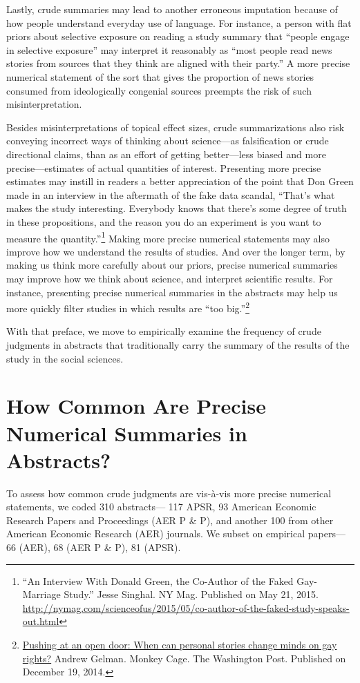 \documentclass[12pt]{article}
\begin{document}
Lastly, crude summaries may lead to another erroneous imputation because of how people understand everyday use of language. For instance, a person with flat priors about selective exposure on reading a study summary that ``people engage in selective exposure'' may interpret it reasonably as ``most people read news stories from sources that they think are aligned with their party.'' A more precise numerical statement of the sort that gives the proportion of news stories consumed from ideologically congenial sources preempts the risk of such misinterpretation. 

Besides misinterpretations of topical effect sizes, crude summarizations also risk conveying incorrect ways of thinking about science---as falsification or crude directional claims, than as an effort of getting better---less biased and more precise---estimates of actual quantities of interest. Presenting more precise estimates may instill in readers a better appreciation of the point that Don Green made in an interview in the aftermath of the fake data scandal, ``That's what makes the study interesting. Everybody knows that there's some degree of truth in these propositions, and the reason you do an experiment is you want to measure the quantity.''\footnote{``An Interview With Donald Green, the Co-Author of the Faked Gay-Marriage Study.'' Jesse Singhal. NY Mag. Published on May 21, 2015. \href{http://nymag.com/scienceofus/2015/05/co-author-of-the-faked-study-speaks-out.html}{http://nymag.com/scienceofus/2015/05/co-author-of-the-faked-study-speaks-out.html}} Making more precise numerical statements may also improve how we understand the results of studies. And over the longer term, by making us think more carefully about our priors, precise numerical summaries may improve how we think about science, and interpret scientific results. For instance, presenting precise numerical summaries in the abstracts may help us more quickly filter studies in which results are ``too big.''\footnote{\href{http://www.washingtonpost.com/blogs/monkey-cage/wp/2014/12/19/pushing-at-an-open-door-when-can-personal-stories-change-minds-on-gay-rights/}{Pushing at an open door: When can personal stories change minds on gay rights?} Andrew Gelman. Monkey Cage. The Washington Post. Published on December 19, 2014.}

With that preface, we move to empirically examine the frequency of crude judgments in abstracts that traditionally carry the summary of the results of the study in the social sciences.

\section*{How Common Are Precise Numerical Summaries in Abstracts?}
\label{sec:sum}
To assess how common crude judgments are vis-\`{a}-vis more precise numerical statements, we coded 310 abstracts--- 117 APSR, 93 American Economic Research Papers and Proceedings (AER P \& P), and another 100 from other American Economic Research (AER) journals. We subset on empirical papers--- 66 (AER), 68 (AER P \& P), 81 (APSR).
\end{document}
